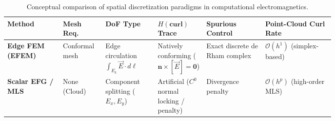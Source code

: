 \documentclass[preprint,12pt]{elsarticle}
\begin{document}
\begin{table}[!htbp]
    \centering
    \footnotesize
    \renewcommand{\arraystretch}{0.92}
    \setlength{\tabcolsep}{3pt}
    \caption{Conceptual comparison of spatial discretization paradigms in computational electromagnetics.}
    \label{tab:meshless_comparison}
    \begin{tabularx}{\linewidth}{@{}
        >{\raggedright\arraybackslash}p{0.17\linewidth}
        >{\centering\arraybackslash}p{0.13\linewidth}
        >{\centering\arraybackslash}p{0.16\linewidth}
        >{\centering\arraybackslash}p{0.14\linewidth}
        >{\centering\arraybackslash}p{0.18\linewidth}
        >{\centering\arraybackslash}X
        @{}}
        \toprule
        \textbf{Method}                                                                      &
        \textbf{Mesh Req.}                                                                   &
        \textbf{DoF Type}                                                                    &
        \textbf{$H(\mathbf{curl})$ Trace}                                                    &
        \textbf{Spurious Control}                                                            &
        \textbf{Point-Cloud Curl Rate}                                                         \\
        \midrule
        \textbf{Edge FEM (EFEM)} \cite{nedelec1980mixed, monk2003finite, boffi2013mixed}     &
        Conformal mesh                                                                       &
        Edge circulation $\int_{E_k} \vec{E} \cdot d\boldsymbol{\ell}$                       &
        Natively conforming ($\mathbf{n} \times [\vec{E}] = \mathbf{0}$)                     &
        Exact discrete de Rham complex                                                       &
        $\mathcal{O}(h^1)$ (simplex-based)                                                     \\
        \addlinespace
        \textbf{Scalar EFG / MLS} \cite{belytschko1994element, cingoski1998element}          &
        None (Cloud)                                                                         &
        Component splitting ($E_x, E_y$)                                                     &
        Artificial ($C^0$ normal locking / penalty)                                          &
        Divergence penalty                                                                   &
        $\mathcal{O}(h^p)$ (high-order MLS)                                                    \\

\end{tabularx}
\end{table}
\end{document}
